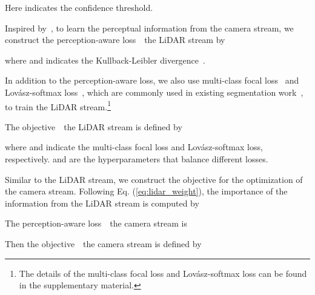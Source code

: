 \documentclass[10pt,twocolumn,letterpaper]{article}
\begin{document}
Here  indicates the confidence threshold.

Inspired by~\cite{hinton2015distilling,jaritz2020xmuda,zhang2018deep}, to learn the perceptual information from the camera stream, we construct the perception-aware loss~\wrt~the LiDAR stream by 

where  and  indicates the Kullback-Leibler divergence~\cite{hinton2015distilling}.













In addition to the perception-aware loss, we also use multi-class focal loss~\cite{lin2017focal} and Lov{\'a}sz-softmax loss~\cite{berman2018lovasz}, which are commonly used in existing segmentation work~\cite{cortinhal2020salsanext,zhu2021cylindrical}, to train the LiDAR stream.\footnote{The details of the multi-class focal loss and Lov{\'a}sz-softmax loss can be found in the supplementary material.} 





The objective~\wrt~the LiDAR stream is defined by

where  and  indicate the multi-class focal loss and Lov{\'a}sz-softmax loss, respectively.   and  are the hyperparameters that balance different losses.

Similar to the LiDAR stream, we construct the objective for the optimization of the camera stream.
Following Eq. (\ref{eq:lidar_weight}), the importance of the information from the LiDAR stream is computed by

The perception-aware loss~\wrt~the camera stream is

Then the objective~\wrt~the camera stream is defined by
\end{document}
